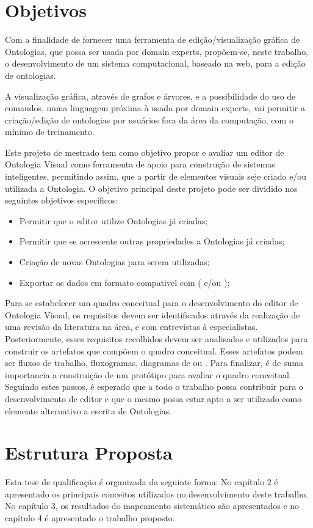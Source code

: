 \section{Objetivos}

Com a finalidade de fornecer uma ferramenta de edição/visualização gráfica de Ontologias, que possa ser usada por domain experts, propõem-se, neste trabalho, o desenvolvimento de um sistema computacional, baseado na web, para a edição de ontologias.

A visualização gráfica, através de grafos e árvores, e a possibilidade do uso de comandos, numa linguagem próxima à usada por domain experts, vai permitir a criação/edição de ontologias por usuários fora da área da computação, com o mínimo de treinamento.

Este projeto de mestrado tem como objetivo propor e avaliar um editor de Ontologia Visual como ferramenta de apoio para construção de sistemas inteligentes, permitindo assim, que a partir de elementos visuais seje criado e/ou utilizada a Ontologia. O objetivo principal deste projeto pode ser dividido nos seguintes objetivos específicos:

\begin{itemize}
\item Permitir que o editor utilize Ontologias já criadas;
\item Permitir que se acrescente outras propriedades a Ontologias já criadas;
\item Criação de novas Ontologias para serem utilizadas;
\item Exportar os dados em formato compativel com  ( e/ou );
\end{itemize}

Para se estabelecer um quadro conceitual para o desenvolvimento do editor de Ontologia Visual, os requisitos devem ser identificados através da realização de uma revisão da literatura na área, e com entrevistas à especialistas. Posteriormente, esses requisitos recolhidos devem ser analisados e utilizados para construir os artefatos que compõem o quadro conceitual. Esses artefatos podem ser fluxos de trabalho, fluxogramas, diagramas de  ou . Para finalizar, é de suma importancia a construição de um protótipo para avaliar o quadro conceitual. Seguindo estes passos, é esperado que a todo o trabalho possa contribuir para o desenvolvimento de editor e que o mesmo possa estar apto a ser utilizado como elemento alternativo a escrita de Ontologias.

\section{Estrutura Proposta}

Esta tese de qualificação é organizada da seguinte forma: No capítulo 2 é apresentado os principais conceitos utilizados no desenvolvimento deste trabalho. No capítulo 3, os resultados do mapeamento sistemático são apresentados e no capítulo 4 é apresentado o trabalho proposto.